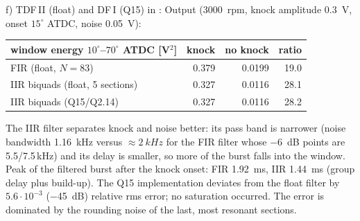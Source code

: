 \begin{solution}
f) TDF\,II (float) and DF\,I (Q15) in
:
Output (\SI{3000}{rpm}, knock amplitude \SI{0.3}{V}, onset $15^\circ$ ATDC,
noise \SI{0.05}{V}):
\begin{center}
\small
\begin{tabular}{@{}lrrr@{}}
\toprule
window energy $10^\circ$--$70^\circ$ ATDC [V$^2$] & knock & no knock & ratio\\
\midrule
FIR (float, $N=83$) & 0.379 & 0.0199 & 19.0\\
IIR biquads (float, 5 sections) & 0.327 & 0.0116 & 28.1\\
IIR biquads (Q15/Q2.14) & 0.327 & 0.0116 & 28.2\\
\bottomrule
\end{tabular}
\end{center}
The IIR filter separates knock and noise better: its pass band is narrower
(noise bandwidth \SI{1.16}{kHz} versus $\approx\SI{2}{kHz}$ for the FIR
filter whose \SI{-6}{dB} points are 5.5/7.5\,kHz) and its delay is smaller, so
more of the burst falls into the window. Peak of the filtered burst after the
knock onset: FIR \SI{1.92}{ms}, IIR \SI{1.44}{ms} (group delay plus build-up).
The Q15 implementation deviates from the float filter by $5.6\cdot10^{-3}$
(\SI{-45}{dB}) relative rms error; no saturation occurred. The error is dominated by
the rounding noise of the last, most resonant sections.
\end{solution}

